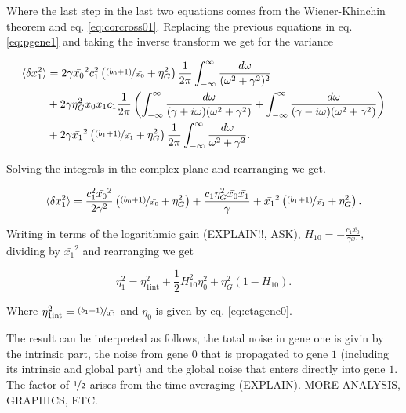 Where the last step in the last two equations comes from the Wiener-Khinchin theorem and eq. \ref{eq:corcross01}. Replacing the previous equations in eq. \ref{eq:pgene1} and taking the inverse transform we get for the variance

\begin{equation}
  \begin{split}
    \langle \delta x_1^2\rangle &= 2\gamma\bar{x_0}^2c_1^2\left(\nicefrac{(b_0+1)}{\bar{x_0}}+ \eta_G^2\right)\frac{1}{2\pi}\int_{-\infty}^{\infty}\frac{d\omega}{(\omega^2+\gamma^2)^2}\\
    &+2\gamma\eta_G^2\bar{x_0}\bar{x_1}c_1\frac{1}{2\pi}\left(\int_{-\infty}^{\infty}\frac{d\omega}{(\gamma + i\omega)(\omega^2+\gamma^2)} + \int_{-\infty}^{\infty}\frac{d\omega}{(\gamma - i\omega)(\omega^2+\gamma^2)}\right)\\
    &+2\gamma\bar{x_1}^2 \left(\nicefrac{(b_1+1)}{\bar{x_1}}+\eta_G^2\right)\frac{1}{2\pi}\int_{-\infty}^{\infty}\frac{d\omega}{\omega^2+\gamma^2}.
  \end{split}
\end{equation} 

Solving the integrals in the complex plane and rearranging we get.

\begin{equation}
  \langle \delta x_1^2\rangle = \frac{c_1^2\bar{x_0}^2}{2\gamma^2}\left(\nicefrac{(b_0+1)}{\bar{x_0}}+ \eta_G^2\right) + \frac{c_1\eta_G^2\bar{x_0}\bar{x_1}}{\gamma} + \bar{x_1}^2\left(\nicefrac{(b_1+1)}{\bar{x_1}}+\eta_G^2\right).
\end{equation}

Writing in terms of the logarithmic gain (EXPLAIN!!, ASK), $H_{10}=-\frac{c_1\bar{x_0}}{\gamma x_1}$, dividing by $\bar{x_1}^2$ and rearranging we get

\begin{equation}
  \label{eq:etagene1}
  \boxed{\eta_1^2 = \eta_{1\text{int}}^2 + \frac{1}{2}H_{10}^2\eta_0^2+\eta_G^2\left(1-H_{10}\right)}.
\end{equation}

Where $\eta_{1\text{int}}^2 = \nicefrac{(b_1+1)}{\bar{x_1}}$ and $\eta_0$ is given by eq. \ref{eq:etagene0}.

The result can be interpreted as follows, the total noise in gene one is givin by the intrinsic part, the noise from gene $0$ that is propagated to gene $1$ (including its intrinsic and global part) and the global noise that enters directly into gene $1$. The factor of $\nicefrac{1}{2}$ arises from the time averaging (EXPLAIN). MORE ANALYSIS, GRAPHICS, ETC.

